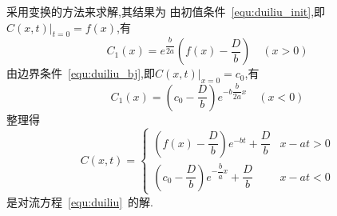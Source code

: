 \documentclass[xcolor=svgnames]{beamer} %
\begin{document}
\begin{frame}
采用变换的方法来求解,其结果为
由初值条件~\eqref{equ:duiliu_init},即$\left.C(x,t)\right|_{t=0}=f(x)$,有
\begin{equation}
C_1(x)=e^{\dfrac{b}{2a}}\left(f(x)-\dfrac{D}{b}\right)\quad(x>0)
\end{equation}
由边界条件~\eqref{equ:duiliu_bj},即$\left.C(x,t)\right|_{x=0}=c_0$,有
\begin{equation}
C_1(x)=\left(c_0-\dfrac{D}{b}\right)e^{-b\dfrac{b}{2a}x}\quad(x<0)
\end{equation}
整理得
\begin{equation}
C(x,t)=
\begin{cases}
\left(f(x)-\dfrac{D}{b}\right)e^{-bt}+\dfrac{D}{b}  & x-at>0 \\
\left(c_0-\dfrac{D}{b}\right)e^{-\dfrac{b}{a}x}+\dfrac{D}{b}	&x-at<0
\end{cases}
\end{equation}
是对流方程~\eqref{equ:duiliu}~的解.
\end{frame}
\end{document}
